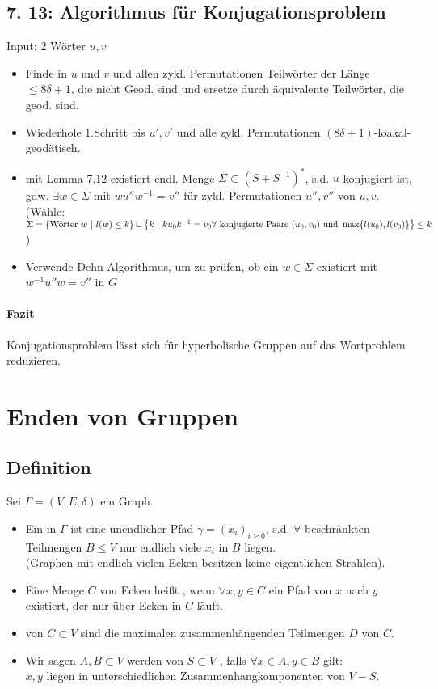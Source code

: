 \documentclass{article}
\begin{document}
\subsection{7. 13: Algorithmus für Konjugationsproblem}
Input: 2 Wörter $u,v$
\begin{itemize}
	\item Finde in $u$ und $v$ und allen zykl. Permutationen Teilwörter der Länge $\leq 8\delta + 1$, die nicht Geod. sind und ersetze durch äquivalente Teilwörter, die geod. sind.
	\item Wiederhole 1.Schritt bis $u', v'$ und alle zykl. Permutationen $(8\delta + 1)$-loakal-geodätisch.
	\item mit Lemma 7.12 existiert endl. Menge $\Sigma \subset (S+S^{-1})^*$, s.d. $u$ konjugiert ist, gdw. $\exists w \in \Sigma$ mit $wu''w^{-1} = v''$ für zykl. Permutationen $u'',v''$ von $u,v$.\\
	(Wähle: $\Sigma = \set{\text{Wörter }w}{l(w) \leq k} \sqcup \set{k}{ku_0k^{-1} = v_0 \forall \text{ konjugierte Paare } (u_0,v_0) \text{ und }\max\{l(u_0), l(v_0)\}} \leq k $)
		\item Verwende Dehn-Algorithmus, um zu prüfen, ob ein $w \in \Sigma$ existiert mit $w^{-1}u''w = v''$ in $G$
\end{itemize}
\paragraph{Fazit} Konjugationsproblem lässt sich für hyperbolische Gruppen auf das Wortproblem reduzieren.

\newpage
\section{Enden von Gruppen}
\subsection{Definition}
Sei $\Gamma = (V,E, \delta)$ ein Graph.
\begin{itemize}
	\item Ein  in $\Gamma$ ist eine unendlicher Pfad $\gamma = (x_i)_{i \geq 0}$, s.d. $\forall$ beschränkten Teilmengen $B \leq V$ nur endlich viele $x_i$ in $B$ liegen.\\
	(Graphen mit endlich vielen Ecken besitzen keine eigentlichen Strahlen).
	\item Eine Menge $C$ von Ecken heißt , wenn $\forall x,y \in C$ ein Pfad von $x$ nach $y$ existiert, der nur über Ecken in $C$ läuft.
	\item {} von $C \subset V$ sind die maximalen zusammenhängenden Teilmengen $D$ von $C$.\\
	\item Wir sagen $A,B \subset V$ werden von $S \subset V$ , falls $\forall x\in A, y \in B$ gilt:\\
	$x,y$ liegen in unterschiedlichen Zusammenhangkomponenten von $V- S$.

\end{itemize}
\end{document}
